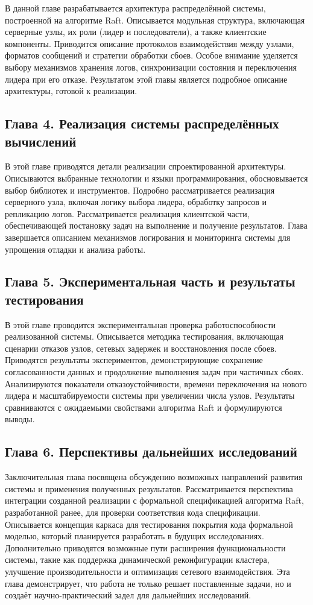 В данной главе разрабатывается архитектура распределённой системы, построенной
на алгоритме Raft. Описывается модульная структура, включающая серверные узлы,
их роли (лидер и последователи), а также клиентские компоненты. Приводится
описание протоколов взаимодействия между узлами, форматов сообщений и стратегии
обработки сбоев. Особое внимание уделяется выбору механизмов хранения логов,
синхронизации состояния и переключения лидера при его отказе. Результатом этой
главы является подробное описание архитектуры, готовой к реализации.

\subsection*{Глава 4. Реализация системы распределённых вычислений}

В этой главе приводятся детали реализации спроектированной архитектуры.
Описываются выбранные технологии и языки программирования, обосновывается выбор
библиотек и инструментов. Подробно рассматривается реализация серверного узла,
включая логику выбора лидера, обработку запросов и репликацию логов.
Рассматривается реализация клиентской части, обеспечивающей постановку задач на
выполнение и получение результатов. Глава завершается описанием механизмов
логирования и мониторинга системы для упрощения отладки и анализа работы.

\subsection*{Глава 5. Экспериментальная часть и результаты тестирования}

В этой главе проводится экспериментальная проверка работоспособности
реализованной системы. Описывается методика тестирования, включающая сценарии
отказов узлов, сетевых задержек и восстановления после сбоев. Приводятся
результаты экспериментов, демонстрирующие сохранение согласованности данных и
продолжение выполнения задач при частичных сбоях. Анализируются показатели
отказоустойчивости, времени переключения на нового лидера и масштабируемости
системы при увеличении числа узлов. Результаты сравниваются с ожидаемыми
свойствами алгоритма Raft и формулируются выводы.

\subsection*{Глава 6. Перспективы дальнейших исследований}

Заключительная глава посвящена обсуждению возможных направлений развития
системы и применения полученных результатов. Рассматривается перспектива
интеграции созданной реализации с формальной спецификацией алгоритма Raft,
разработанной ранее, для проверки соответствия кода спецификации. Описывается
концепция каркаса для тестирования покрытия кода формальной моделью, который
планируется разработать в будущих исследованиях. Дополнительно приводятся
возможные пути расширения функциональности системы, такие как поддержка
динамической реконфигурации кластера, улучшение производительности и
оптимизация сетевого взаимодействия. Эта глава демонстрирует, что работа не
только решает поставленные задачи, но и создаёт научно-практический задел для
дальнейших исследований.

